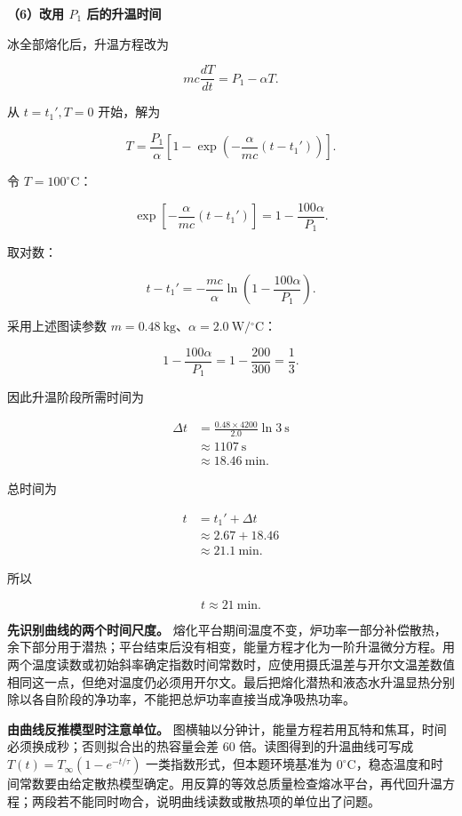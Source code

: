 \documentclass[12pt,a4paper,UTF8]{ctexart}
\begin{document}
\textbf{（6）改用 \(P_1\) 后的升温时间}

冰全部熔化后，升温方程改为

\[
mc\frac{dT}{dt}=P_1-\alpha T.
\]

从 \(t=t_1',T=0\) 开始，解为

\[
T=\frac{P_1}{\alpha}
\left[1-\exp\left(-\frac{\alpha}{mc}(t-t_1')\right)\right].
\tag{11}
\]

令 \(T=100^\circ\mathrm C\)：

\[
\exp\left[-\frac{\alpha}{mc}(t-t_1')\right]
=1-\frac{100\alpha}{P_1}.
\]

取对数：

\[
t-t_1'
=-\frac{mc}{\alpha}
\ln\left(1-\frac{100\alpha}{P_1}\right).
\tag{12}
\]

采用上述图读参数
\(m=0.48\ \mathrm{kg}\)、\(\alpha=2.0\ \mathrm{W/{}^\circ C}\)：

\[
1-\frac{100\alpha}{P_1}
=1-\frac{200}{300}
=\frac13.
\]

因此升温阶段所需时间为

\[
\begin{aligned}
\Delta t
&=\frac{0.48\times4200}{2.0}\ln3\ \mathrm s\\
&\approx1107\ \mathrm s\\
&\approx18.46\ \mathrm{min}.
\end{aligned}
\]

总时间为

\[
\begin{aligned}
t
&=t_1'+\Delta t\\
&\approx2.67+18.46\\
&\approx21.1\ \mathrm{min}.
\end{aligned}
\]

所以

\[
\boxed{t\approx21\ \mathrm{min}}.
\tag{13}
\]

\textbf{先识别曲线的两个时间尺度。}
熔化平台期间温度不变，炉功率一部分补偿散热，余下部分用于潜热；平台结束后没有相变，能量方程才化为一阶升温微分方程。用两个温度读数或初始斜率确定指数时间常数时，应使用摄氏温差与开尔文温差数值相同这一点，但绝对温度仍必须用开尔文。最后把熔化潜热和液态水升温显热分别除以各自阶段的净功率，不能把总炉功率直接当成净吸热功率。

\textbf{由曲线反推模型时注意单位。}
图横轴以分钟计，能量方程若用瓦特和焦耳，时间必须换成秒；否则拟合出的热容量会差
\(60\) 倍。读图得到的升温曲线可写成 \(T(t)=T_\infty(1-e^{-t/\tau})\)
一类指数形式，但本题环境基准为
\(0^\circ\mathrm C\)，稳态温度和时间常数要由给定散热模型确定。用反算的等效总质量检查熔冰平台，再代回升温方程；两段若不能同时吻合，说明曲线读数或散热项的单位出了问题。
\end{document}
